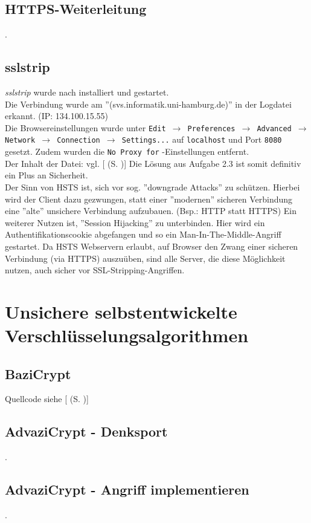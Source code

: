 \documentclass[twoside]{article}
\newcommand{\say}[1]{%
	''#1''%
}
\newcommand{\ttt}[1]{%
	\texttt{#1}%
}
\newcommand{\mref}[1]{[\nameref{#1} (S. \pageref{#1})]}
\begin{document}
	\subsection{HTTPS-Weiterleitung}
		\label{ssec:https}
		.
	\subsection{sslstrip}
		\label{ssec:sslstrip}
		\textit{sslstrip} wurde nach \cite{sslstrip} installiert und gestartet.\\
		Die Verbindung wurde am \say{(svs.informatik.uni-hamburg.de)} in der Logdatei erkannt. (IP: 134.100.15.55)\\
		Die Browsereinstellungen wurde unter \ttt{Edit $\rightarrow$ Preferences $\rightarrow$ Advanced $\rightarrow$ Network $\rightarrow$ Connection $\rightarrow$ Settings...} auf \ttt{localhost} und Port \ttt{8080} gesetzt.
		Zudem wurden die \ttt{No Proxy for}-Einstellungen entfernt.\\
		Der Inhalt der Datei: vgl. \mref{ssllog}
		Die Lösung aus Aufgabe 2.3 ist somit definitiv ein Plus an Sicherheit.\\
		Der Sinn von HSTS ist, sich vor sog. \say{downgrade Attacks} zu schützen.
		Hierbei wird der Client dazu gezwungen, statt einer \say{modernen} sicheren Verbindung eine \say{alte} unsichere Verbindung aufzubauen. (Bsp.: HTTP statt HTTPS)
		Ein weiterer Nutzen ist, \say{Session Hijacking} zu unterbinden.
		Hier wird ein Authentifikationscookie abgefangen und so ein Man-In-The-Middle-Angriff gestartet.
		Da HSTS Webservern erlaubt, auf Browser den Zwang einer sicheren Verbindung (via HTTPS) auszuüben, sind alle Server, die diese Möglichkeit nutzen, auch sicher vor SSL-Stripping-Angriffen.
		
\section{Unsichere selbstentwickelte Verschlüsselungsalgorithmen}
	\label{sec:encrypt}
	\subsection{BaziCrypt}
		\label{ssec:bazi}
		Quellcode siehe \mref{bazicrypt}
	\subsection{AdvaziCrypt - Denksport}
		\label{ssec:advazi}
		.
	\subsection{AdvaziCrypt - Angriff implementieren}
		\label{ssec:advazi2}
		.
		
\end{document}
